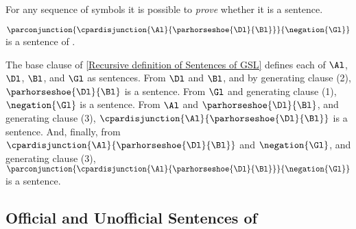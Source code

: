 For any sequence of \GSL{} symbols it is possible to \emph{prove} whether it is a sentence.

\begin{majorILnc}{}
$\parconjunction{\cpardisjunction{\Al}{\parhorseshoe{\Dl}{\Bl}}}{\negation{\Gl}}$ is a sentence of \GSL{}. 

\noindent{}The base clause of \ref{Recursive definition of Sentences of GSL} defines each of $\Al$, $\Dl$, $\Bl$, and $\Gl$ as sentences. 
From $\Dl$ and $\Bl$, and by generating clause (2), $\parhorseshoe{\Dl}{\Bl}$ is a sentence. 
From $\Gl$ and generating clause (1), $\negation{\Gl}$ is a sentence. 
From $\Al$ and $\parhorseshoe{\Dl}{\Bl}$, and generating clause (3), $\cpardisjunction{\Al}{\parhorseshoe{\Dl}{\Bl}}$ is a sentence. 
And, finally, from $\cpardisjunction{\Al}{\parhorseshoe{\Dl}{\Bl}}$ and $\negation{\Gl}$, and generating clause (3), $\parconjunction{\cpardisjunction{\Al}{\parhorseshoe{\Dl}{\Bl}}}{\negation{\Gl}}$ is a sentence. 
\end{majorILnc}

\subsection{Official and Unofficial Sentences of \GSL{}}\label{Unofficial Sentences of GSL}

